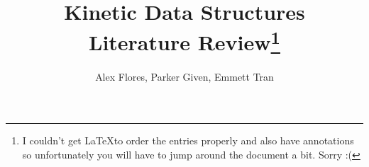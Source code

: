 \documentclass[10pt]{article}
\title{Kinetic Data Structures \\\medskip Literature Review\footnote{I couldn't get \LaTeX to order the entries
properly and also have annotations so unfortunately you will have to jump around the document a bit. Sorry :(}}
\author{Alex Flores, Parker Given, Emmett Tran}
\begin{document}
\maketitle
\nocite{*}


\end{document}
